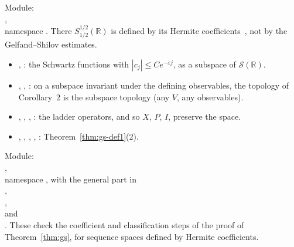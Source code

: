 \documentclass[11pt]{article}
\theoremstyle{definition}
\begin{document}
Module:\\ ,\\ namespace
. There $S^{1/2}_{1/2}(\mathbb R)$ is defined by
its Hermite coefficients~\cite[Remark~1.3]{gpr}, not by the Gelfand--Shilov estimates.
\begin{itemize}
  \item {}, : the Schwartz functions with
    $|c_j| \le Ce^{-\varepsilon j}$, as a subspace of $\mathcal S(\mathbb R)$.
  \item {}, , : on a subspace
    invariant under the defining observables, the topology of Corollary~2 is the subspace
    topology (any $V$, any observables).
  \item {}, , ,
    : the ladder operators, and so $X$, $P$, $I$, preserve the space.
  \item {}, ,
    , ,
    : Theorem~\ref{thm:gs-def1}(2).
\end{itemize}
Module:\\ ,\\ namespace
, with the general part in\\
,\\
,\\
 and\\
. These check the coefficient and classification steps
of the proof of Theorem~\ref{thm:gs}, for sequence spaces defined by Hermite coefficients.
\end{document}
